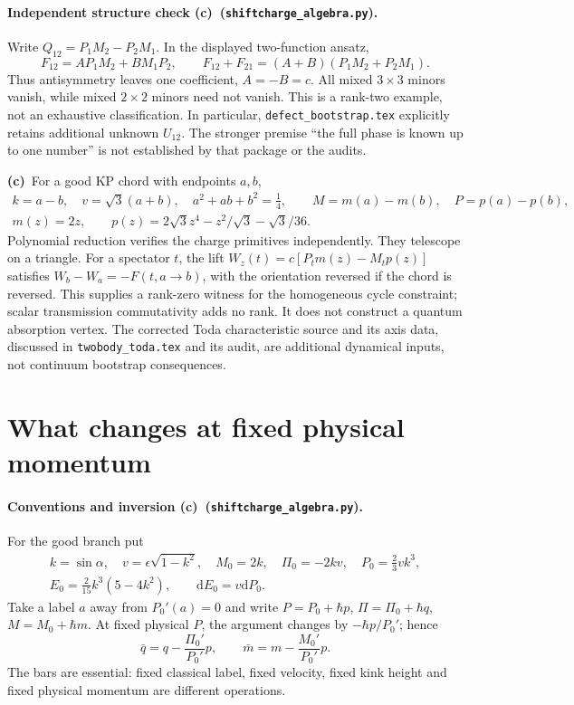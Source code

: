\documentclass[11pt,a4paper]{article}
\newcommand{\C}{\textbf{(c)}\ }
\newcommand{\dd}{\mathrm d}
\newcommand{\file}[1]{\nolinkurl{#1}}
\newcommand{\alg}{\file{shiftcharge_algebra.py}}
\begin{document}
\paragraph{Independent structure check \C (\alg).}
Write $Q_{12}=P_1M_2-P_2M_1$. In the displayed two-function ansatz,
\begin{equation}
 F_{12}=A P_1M_2+B M_1P_2,\qquad F_{12}+F_{21}=(A+B)(P_1M_2+P_2M_1).
\end{equation}
Thus antisymmetry leaves one coefficient, $A=-B=c$. All mixed $3\times3$
minors vanish, while mixed $2\times2$ minors need not vanish. This is a
rank-two example, not an exhaustive classification. In particular,
\file{defect_bootstrap.tex} explicitly retains additional unknown $U_{12}$.
The stronger premise ``the full phase is known up to one number'' is not
established by that package or the audits.

\C For a good KP chord with endpoints $a,b$,
\begin{gather}
 k=a-b,\quad v=\sqrt3(a+b),\quad a^2+ab+b^2=\tfrac14,\qquad
 M=m(a)-m(b),\quad P=p(a)-p(b),\label{chords}\\
 m(z)=2z,\qquad p(z)=2\sqrt3 z^4-z^2/\sqrt3-\sqrt3/36.
\end{gather}
Polynomial reduction verifies the charge primitives independently. They
telescope on a triangle. For a spectator $t$, the lift
$W_z(t)=c[P_t m(z)-M_t p(z)]$ satisfies
$W_b-W_a=-F(t,a\!\to\! b)$, with the orientation reversed if the chord is
reversed. This supplies a rank-zero witness for the homogeneous cycle
constraint; scalar transmission commutativity adds no rank. It does not
construct a quantum absorption vertex. The corrected Toda characteristic
source and its axis data, discussed in \file{twobody_toda.tex} and its audit,
are additional dynamical inputs, not continuum bootstrap consequences.

\section{What changes at fixed physical momentum}
\paragraph{Conventions and inversion \C (\alg).}
For the good branch put
\begin{gather}
 k=\sin\alpha,\quad v=\epsilon\sqrt{1-k^2},\quad
 M_0=2k,\quad \Pi_0=-2kv,\quad P_0=\tfrac23vk^3,\\
 E_0=\tfrac2{15}k^3(5-4k^2),\qquad \dd E_0=v\dd P_0.
\end{gather}
Take a label $a$ away from $P_0'(a)=0$ and write
$P=P_0+\hbar p$, $\Pi=\Pi_0+\hbar q$, $M=M_0+\hbar m$.
At fixed physical $P$, the argument changes by $-\hbar p/P_0'$; hence
\begin{equation}
 \bar q=q-\frac{\Pi_0'}{P_0'}p,\qquad
 \bar m=m-\frac{M_0'}{P_0'}p.\label{fixedP}
\end{equation}
The bars are essential: fixed classical label, fixed velocity, fixed kink
height and fixed physical momentum are different operations.
\end{document}
